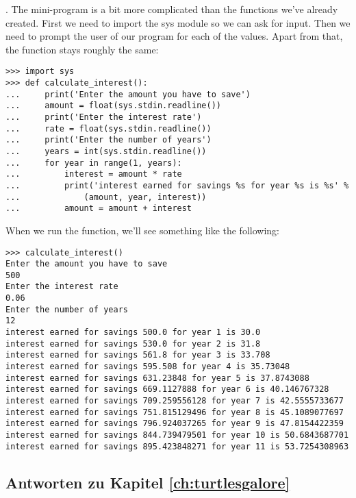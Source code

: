 . The mini-program is a bit more complicated than the functions we've already created.  First we need to import the sys module so we can ask for input.  Then we need to prompt the user of our program for each of the values.  Apart from that, the function stays roughly the same:

\begin{listing}
\begin{verbatim}
>>> import sys
>>> def calculate_interest():
...     print('Enter the amount you have to save')
...     amount = float(sys.stdin.readline())
...     print('Enter the interest rate')
...     rate = float(sys.stdin.readline())
...     print('Enter the number of years')
...     years = int(sys.stdin.readline())
...     for year in range(1, years):
...         interest = amount * rate
...         print('interest earned for savings %s for year %s is %s' % 
...             (amount, year, interest))
...         amount = amount + interest
\end{verbatim}
\end{listing}

\noindent
When we run the function, we'll see something like the following:

\begin{listingignore}
\begin{verbatim}
>>> calculate_interest()
Enter the amount you have to save
500
Enter the interest rate
0.06
Enter the number of years
12
interest earned for savings 500.0 for year 1 is 30.0
interest earned for savings 530.0 for year 2 is 31.8
interest earned for savings 561.8 for year 3 is 33.708
interest earned for savings 595.508 for year 4 is 35.73048
interest earned for savings 631.23848 for year 5 is 37.8743088
interest earned for savings 669.1127888 for year 6 is 40.146767328
interest earned for savings 709.259556128 for year 7 is 42.5555733677
interest earned for savings 751.815129496 for year 8 is 45.1089077697
interest earned for savings 796.924037265 for year 9 is 47.8154422359
interest earned for savings 844.739479501 for year 10 is 50.6843687701
interest earned for savings 895.423848271 for year 11 is 53.7254308963
\end{verbatim}
\end{listingignore}

\subsection*{Antworten zu Kapitel \ref{ch:turtlesgalore}}

